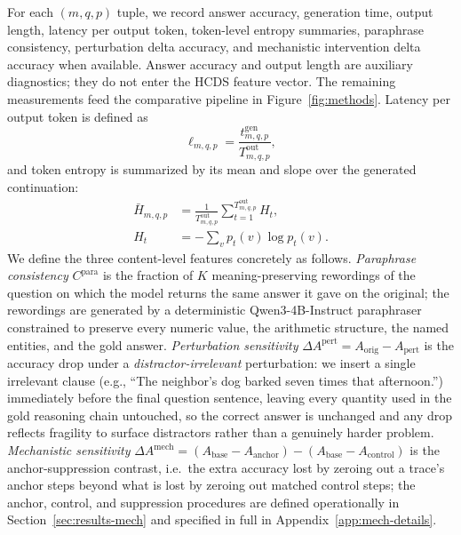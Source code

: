 \documentclass{article}
\theoremstyle{plain}
\theoremstyle{definition}
\theoremstyle{remark}
\begin{document}
For each $(m,q,p)$ tuple, we record answer accuracy, generation time, output length, latency per output token, token-level entropy summaries, paraphrase consistency, perturbation delta accuracy, and mechanistic intervention delta accuracy when available. Answer accuracy and output length are auxiliary diagnostics; they do not enter the HCDS feature vector. The remaining measurements feed the comparative pipeline in Figure~\ref{fig:methods}. Latency per output token is defined as
\[
\ell_{m,q,p} = \frac{t^{\mathrm{gen}}_{m,q,p}}{T^{\mathrm{out}}_{m,q,p}},
\]
and token entropy is summarized by its mean and slope over the generated continuation:
\[
\begin{aligned}
\bar{H}_{m,q,p}
&=
\frac{1}{T^{\mathrm{out}}_{m,q,p}}
\sum_{t=1}^{T^{\mathrm{out}}_{m,q,p}}
H_t,
\\
H_t
&= -\sum_{v} p_t(v)\log p_t(v).
\end{aligned}
\]
We define the three content-level features concretely as follows. \emph{Paraphrase consistency} $C^{\mathrm{para}}$ is the fraction of $K$ meaning-preserving rewordings of the question on which the model returns the same answer it gave on the original; the rewordings are generated by a deterministic Qwen3-4B-Instruct paraphraser constrained to preserve every numeric value, the arithmetic structure, the named entities, and the gold answer. \emph{Perturbation sensitivity} $\Delta A^{\mathrm{pert}} = A_{\mathrm{orig}} - A_{\mathrm{pert}}$ is the accuracy drop under a \emph{distractor-irrelevant} perturbation: we insert a single irrelevant clause (e.g., ``The neighbor's dog barked seven times that afternoon.'') immediately before the final question sentence, leaving every quantity used in the gold reasoning chain untouched, so the correct answer is unchanged and any drop reflects fragility to surface distractors rather than a genuinely harder problem. \emph{Mechanistic sensitivity} $\Delta A^{\mathrm{mech}} = (A_{\mathrm{base}} - A_{\mathrm{anchor}}) - (A_{\mathrm{base}} - A_{\mathrm{control}})$ is the anchor-suppression contrast, i.e.\ the extra accuracy lost by zeroing out a trace's anchor steps beyond what is lost by zeroing out matched control steps; the anchor, control, and suppression procedures are defined operationally in Section~\ref{sec:results-mech} and specified in full in Appendix~\ref{app:mech-details}.
\end{document}
